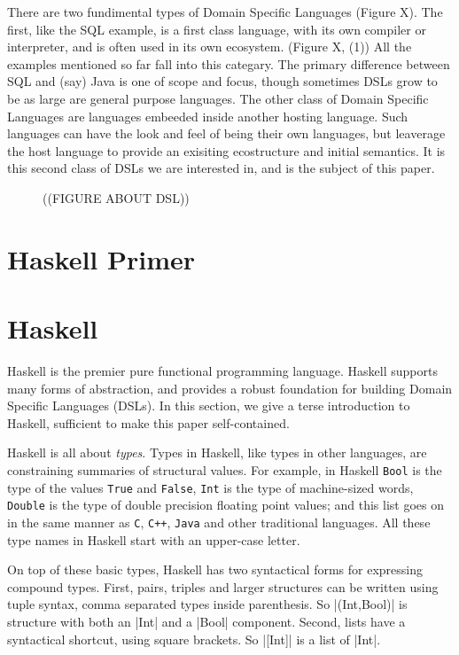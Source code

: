 \documentclass[11pt]{article}
\begin{document}
There are two fundimental types of Domain Specific Languages
(Figure X).
%
The first, like the SQL example, is a first class language,
with its own compiler or interpreter, and is often used in
its own ecosystem. (Figure X, (1)) 
All the examples mentioned so far fall
into this categary. The primary difference between SQL and
(say) Java is one of scope and focus, though sometimes
DSLs grow to be as large are general purpose languages.
%
The other class of Domain Specific Languages are languages
embeeded inside another hosting language. Such languages
can have the look and feel of being their own languages,
but leaverage the host language to provide an exisiting
ecostructure and initial semantics. It is this second
class of DSLs we are interested in, and is the subject of
this paper.

\begin{figure}
((FIGURE ABOUT DSL))

\end{figure}

\section{Haskell Primer}

\section{Haskell}

Haskell is the premier pure functional programming language.
Haskell supports many forms of abstraction, and provides
a robust foundation for building Domain Specific Languages (DSLs).
In this section, we give a terse
introduction to Haskell,
sufficient to make this paper self-contained.

Haskell is all about {\em types\/}. Types in Haskell, like
types in other languages, are constraining summaries of structural values.
For example, in Haskell \verb|Bool| is the type of the values
\verb|True| and \verb|False|, \verb|Int| is the type of machine-sized
words, \verb|Double| is the type of double precision floating
point values; and this list goes on in the same manner as
\verb|C|, \verb|C++|, \verb|Java| and other traditional languages.
All these type names in Haskell start with an upper-case letter.

On top of these basic types, Haskell has two syntactical forms for expressing
compound types.
First, pairs, triples and larger structures can be written using tuple syntax,
comma separated types inside parenthesis.
So |(Int,Bool)| is structure with both an |Int| and a |Bool| component.
Second, lists have a syntactical shortcut, using square brackets.
So |[Int]| is a list of |Int|.
\end{document}
